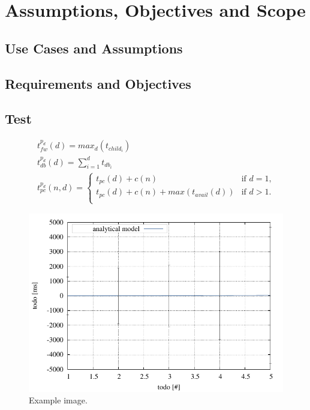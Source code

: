 
\cleardoublepage\chapter{Assumptions, Objectives and Scope}\minitoc\label{sec:assumptions}\vspace{.5cm}
\noindent\lipsum[7]

\section{Use Cases and Assumptions}
\lipsum[5]

\section{Requirements and Objectives}
\lipsum[5]

\section{Test}

\cite{Waitzman:1999}

\small
\begin{equation}
  \begin{array}{l}
    \displaystyle t^{p_d}_{fw}(d) = max_{d}(t_{child_{i}}) \\
    \displaystyle t^{p_d}_{db}(d) = \sum_{i=1}^{d} t_{db_{i}} \\
    \displaystyle t^{p_d}_{pc}(n,d) =
    	\begin{cases}
        	t_{pc}(d) + c(n) & \text{if $d = 1$,}\\
        	t_{pc}(d) + c(n) + max(t_{avail}(d)) & \text{if $d>1$.}\\
        \end{cases}
  \end{array}
  \label{eq:var_idb}
\end{equation}
\normalsize

\begin{figure}
    \centering
    \includegraphics[width=.65\textwidth]{resources/images/example1.pdf}
    \caption{Example image.}
    \label{fig:example1}
\end{figure}

